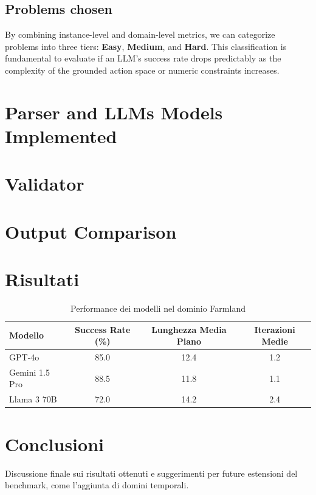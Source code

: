 \documentclass[a4paper]{article}
\begin{document}
    \subsection{Problems chosen}

    By combining instance-level and domain-level metrics, we can categorize problems into three tiers: \textbf{Easy}, \textbf{Medium}, and \textbf{Hard}. This classification is fundamental to evaluate if an LLM's success rate drops predictably as the complexity of the grounded action space or numeric constraints increases.


\section{Parser and LLMs Models Implemented}


\section{Validator}


\section{Output Comparison}


\section{Risultati}
\begin{table}[h]
    \centering
    \caption{Performance dei modelli nel dominio Farmland}
    \begin{tabular}{lccc}
        \toprule
        Modello & Success Rate (\%) & Lunghezza Media Piano & Iterazioni Medie \\
        \midrule
        GPT-4o & 85.0 & 12.4 & 1.2 \\
        Gemini 1.5 Pro & 88.5 & 11.8 & 1.1 \\
        Llama 3 70B & 72.0 & 14.2 & 2.4 \\
        \bottomrule
    \end{tabular}
\end{table}

\section{Conclusioni}
Discussione finale sui risultati ottenuti e suggerimenti per future estensioni del benchmark, come l'aggiunta di domini temporali.


\end{document}

